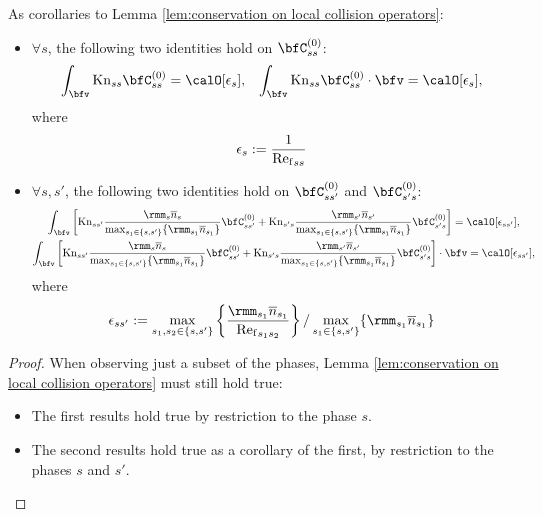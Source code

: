     \begin{corollary}\label{cor:phase-restricted conservation on local collision operators}
        As corollaries to Lemma \ref{lem:conservation on local collision operators}:
        \begin{itemize}
            \item  $\forall s$, the following two identities hold on $\bfC_{ss}^{(0)}$:
            \begin{align}
                \int_{\bfv}\rmKn_{ss}\bfC_{ss}^{(0)}  =  \calO[\epsilon_{s}],  &&
                \int_{\bfv}\rmKn_{ss}\bfC_{ss}^{(0)}\cdot\bfv  =  \calO[\epsilon_{s}],
            \end{align}
            where
            \begin{equation}
                \epsilon_{s}  :=  \frac{1}{{\mathrm{Re}_{\mathrm{f}}}_{ss}}
            \end{equation}
            \item  $\forall s, s'$, the following two identities hold on $\bfC_{ss'}^{(0)}$ and $\bfC_{s's}^{(0)}$:
            \begin{multline}
                \int_{\bfv}\left[\rmKn_{ss'}\frac{\rmm_{s}\overline{n}_{s}}{\max_{s_{1} \in \{s, s'\}}\{\rmm_{s_{1}}\overline{n}_{s_{1}}\}}\bfC_{ss'}^{(0)} + \rmKn_{s's}\frac{\rmm_{s'}\overline{n}_{s'}}{\max_{s_{1} \in \{s, s'\}}\{\rmm_{s_{1}}\overline{n}_{s_{1}}\}}\bfC_{s's}^{(0)}\right]  =  \calO[\epsilon_{ss'}],  \\
                \int_{\bfv}\left[\rmKn_{ss'}\frac{\rmm_{s}\overline{n}_{s}}{\max_{s_{1} \in \{s, s'\}}\{\rmm_{s_{1}}\overline{n}_{s_{1}}\}}\bfC_{ss'}^{(0)} + \rmKn_{s's}\frac{\rmm_{s'}\overline{n}_{s'}}{\max_{s_{1} \in \{s, s'\}}\{\rmm_{s_{1}}\overline{n}_{s_{1}}\}}\bfC_{s's}^{(0)}\right]\cdot\bfv  =  \calO[\epsilon_{ss'}],
            \end{multline}
            where
            \begin{equation}
                \epsilon_{ss'}  :=  \max_{s_{1}, s_{2} \in \{s, s'\}}\left\{\frac{\rmm_{s_{1}}\overline{n}_{s_{1}}}{{\rmRef}_{s_{1}s_{2}}}\right\}/\max_{s_{1} \in \{s, s'\}}\{\rmm_{s_{1}}\overline{n}_{s_{1}}\}
            \end{equation}
        \end{itemize}
    \end{corollary}
    \begin{proof}
        When observing just a subset of the phases, Lemma \ref{lem:conservation on local collision operators} must still hold true:
        \begin{itemize}
            \item  The first results hold true by restriction to the phase $s$.
            \item  The second results hold true as a corollary of the first, by restriction to the phases $s$ and $s'$.
        \end{itemize}
    \end{proof}
